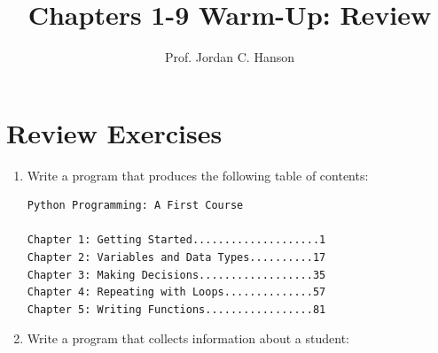 \documentclass{article}
\begin{document}
\twocolumn

\title{Chapters 1-9 Warm-Up: Review}
\author{Prof. Jordan C. Hanson}

\maketitle

\section{Review Exercises}

\begin{enumerate}
\item Write a program that produces the following table of contents:
\begin{verbatim}
Python Programming: A First Course

Chapter 1: Getting Started....................1
Chapter 2: Variables and Data Types..........17
Chapter 3: Making Decisions..................35
Chapter 4: Repeating with Loops..............57
Chapter 5: Writing Functions.................81
\end{verbatim}
\item Write a program that collects information about a student:


\end{enumerate}
\end{document}
